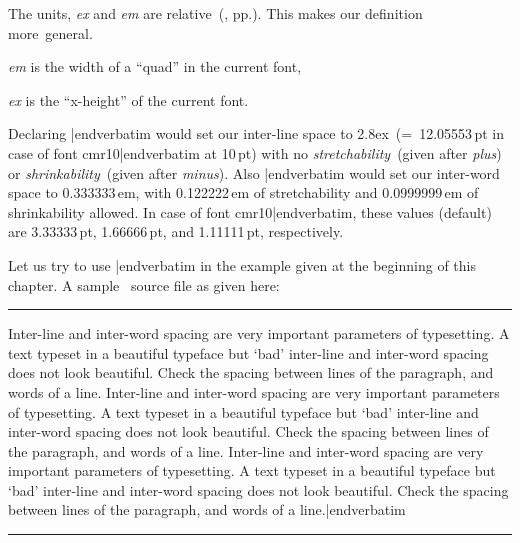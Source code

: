 {\ii The units, {\sl ex\/} and {\sl em\/} are relative~(\cite{knuth_texbook}, pp.). This makes our definition more~general.\ms

{\sl em\/} is the width of a ``quad'' in the current font,

{\sl ex\/} is the ``x-height'' of the current font.\sk

\ii Declaring {\color{brown}\verbatim \fontspacing|endverbatim} would set our inter-line space to 2.8ex~(=~12.05553\,pt in case of font {\verbatim cmr10|endverbatim} at 10\,pt) with no {\sl stretchability\/}~(given after {\sl plus\/}) or {\sl shrinkability}~(given after {\sl minus\/}). Also {\color{brown}\verbatim \fontspacing|endverbatim} would set our inter-word space to 0.333333\,em, with 0.122222\,em of stretchability and 0.0999999\,em of shrinkability allowed. In case of font {\verbatim cmr10|endverbatim}, these values (default) are 3.33333\,pt, 1.66666\,pt, and 1.11111\,pt, respectively.

Let us try to use {\color{brown}\verbatim \fontspacing|endverbatim} in the example given at the beginning of this chapter. A sample \capstex\ source file as given here:


\newpage

\bigskip\hrule\vbox{\noindent\vrule\NoBlackBoxes\vbox{\vskip2mm
{\obeylines\parindent=0pt\color{brown}
\verbatim
\parindent=0pt
\fontspacing %
Inter-line and inter-word spacing are very important parameters of
typesetting. A text typeset in a beautiful typeface but `bad'
inter-line and inter-word spacing does not look beautiful. Check
the spacing between lines of the paragraph, and words of a line.
\medskip
\sixrm %
\fontspacing %
Inter-line and inter-word spacing are very important parameters of
typesetting. A text typeset in a beautiful typeface but `bad'
inter-line and inter-word spacing does not look beautiful. Check
the spacing between lines of the paragraph, and words of a line.
\medskip
\eighteenrm %
\fontspacing %
Inter-line and inter-word spacing are very important parameters of
typesetting. A text typeset in a beautiful typeface but `bad'
inter-line and inter-word spacing does not look beautiful. Check
the spacing between lines of the paragraph, and words of a line.|endverbatim}
\vskip2mm}\vrule}\hrule\BlackBoxes\bigskip


}
